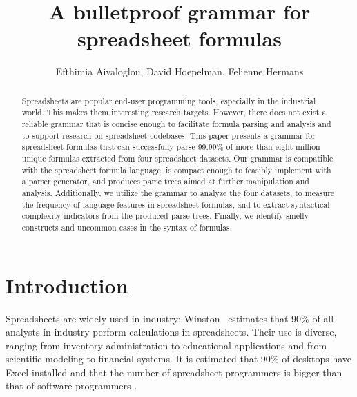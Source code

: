 \documentclass[times]{smrauth}
\begin{document}

\title{A bulletproof grammar for spreadsheet formulas}

\author{Efthimia Aivaloglou\corrauth, David Hoepelman, Felienne Hermans}

\address{Software Engineering Research Group, Delft University of Technology, Mekelweg 4, 2628 CD, Delft, The Netherlands}


\begin{abstract}
Spreadsheets are popular end-user programming tools, especially in the industrial world. This makes them interesting research targets. However, there does not exist a reliable grammar that is concise enough to facilitate formula parsing and analysis and to support research on spreadsheet codebases.
This paper presents a grammar for spreadsheet formulas that can successfully parse 99.99\% of more than eight million unique formulas extracted from four spreadsheet datasets. Our grammar is compatible with the spreadsheet formula language, is compact enough to feasibly implement with a parser generator, and produces parse trees aimed at further manipulation and analysis. 
Additionally, we utilize the grammar to analyze the four datasets, to measure the frequency of language features in spreadsheet formulas, and to extract syntactical complexity indicators from the produced parse trees.
Finally, we identify smelly constructs and uncommon cases in the syntax of formulas.
\end{abstract}


\maketitle

\section{Introduction}
Spreadsheets are widely used in industry: Winston~\cite{Wins2001} estimates that 90\% of all analysts in industry perform calculations in
spreadsheets. Their use is diverse, ranging from inventory administration to educational applications and from scientific
modeling to financial systems. It is estimated that 90\% of desktops have Excel installed \cite{DBLP:conf/icse/BradleyM09} and that the number of spreadsheet programmers is bigger than that of software programmers \cite{DBLP:conf/vl/ScaffidiSM05, SANERAll}. 
\end{document}

